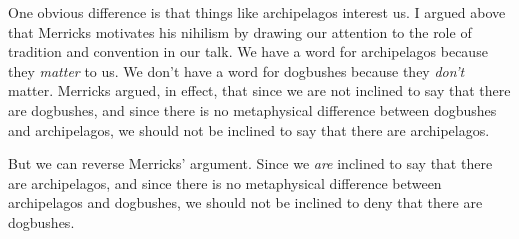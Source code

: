 \documentclass[11pt]{article}
\begin{document}
\begin{spacing}{1.25}
One obvious difference is that things like archipelagos interest us.
I argued above that Merricks motivates his nihilism by drawing our
attention to the role of tradition and convention in our talk.  We
have a word for archipelagos because they {\em matter} to us.  We
don't have a word for dogbushes because they {\em don't} matter.
Merricks argued, in effect, that since we are not inclined to say that
there are dogbushes, and since there is no metaphysical difference
between dogbushes and archipelagos, we should not be inclined to say
that there are archipelagos.

But we can reverse Merricks' argument.  Since we {\em are} inclined to
say that there are archipelagos, and since there is no metaphysical
difference between archipelagos and dogbushes, we should not be
inclined to deny that there are dogbushes.





\end{spacing}
\end{document}
